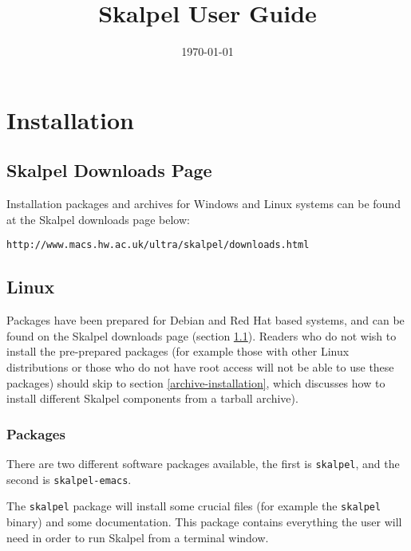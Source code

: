 \documentclass{report}
\title{Skalpel User Guide}
\date{\today}
\begin{document}
\maketitle
\vspace{110mm}

\newpage

\tableofcontents

\newpage

\chapter {Installation}

\section {Skalpel Downloads Page}
\label{skalpel-downloads-page}

Installation packages and archives for Windows and Linux systems can
be found at the Skalpel downloads page below:

\begin{center}\texttt{http://www.macs.hw.ac.uk/ultra/skalpel/downloads.html}\end{center}

\section {Linux}

Packages have been prepared for Debian and Red Hat based systems, and
can be found on the Skalpel downloads page (section
\ref{skalpel-downloads-page}). Readers who do not wish to install the
pre-prepared packages (for example those with other Linux
distributions or those who do not have root access will not be able to
use these packages) should skip to section \ref{archive-installation},
which discusses how to install different Skalpel components from a
tarball archive).

\subsection {Packages}

There are two different software packages available, the first is
\texttt{skalpel}, and the second is \texttt{skalpel-emacs}.

The \texttt{skalpel} package will install some crucial files (for
example the \texttt{skalpel} binary) and some documentation. This
package contains everything the user will need in order to run Skalpel
from a terminal window.
\end{document}
